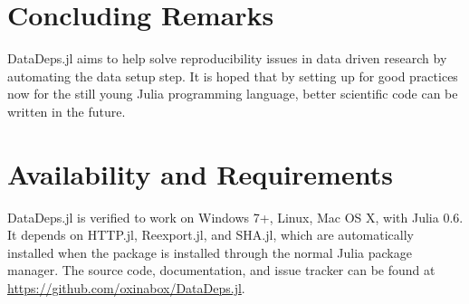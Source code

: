 \documentclass[twoside,11pt]{article}\usepackage{jmlr2e}
\begin{document}
\section {Concluding Remarks}
DataDeps.jl aims to help solve reproducibility issues in data driven research by automating the data setup step.
It is hoped that by setting up for good practices now for the still young Julia programming language, better scientific code can be written in the future.



\section{Availability and Requirements}
DataDeps.jl is verified to work on  Windows 7+, Linux, Mac OS X, with Julia 0.6.
It depends on HTTP.jl, Reexport.jl, and SHA.jl, which are automatically installed when the package is installed through the normal Julia package manager.
The source code, documentation, and issue tracker can be found at \url{https://github.com/oxinabox/DataDeps.jl}.

\newpage

\end{document}
